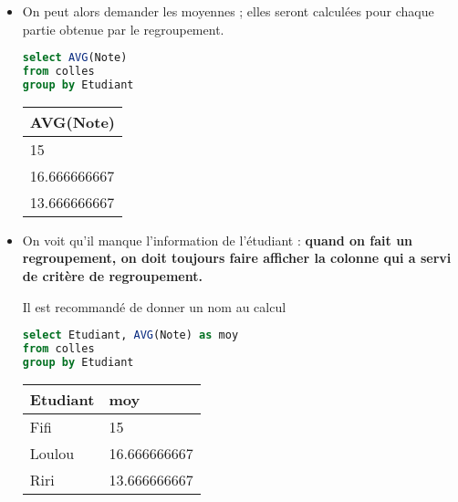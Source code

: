 \vfill

\begin{itemize}
\item
On peut alors demander les moyennes ; elles seront calculées pour chaque partie obtenue par le regroupement.

\begin{minipage}[t]{0.60\linewidth}
\begin{lstlisting}[language=SQL]
select AVG(Note)
from colles
group by Etudiant
\end{lstlisting}
\end{minipage}
\begin{minipage}[t]{0.30\linewidth}
\begin{center}
\begin{tabular}[t]{|l|}
\hline
\bf AVG(Note) \\ 
\hline
15\\
16.666666667\\
13.666666667\\
\hline
\end{tabular}
\end{center}
\end{minipage}

\newpage
\item
On voit qu'il manque l'information de l'étudiant : {\bf quand on fait un regroupement, on doit toujours faire afficher la colonne qui a servi de critère de regroupement.}

Il est recommandé de donner un nom au calcul

\begin{minipage}[t]{0.6\linewidth}
\begin{lstlisting}[language=SQL]
select Etudiant, AVG(Note) as moy
from colles
group by Etudiant
\end{lstlisting}
\end{minipage}
\begin{minipage}[t]{0.35\linewidth}
\begin{center}
\begin{tabular}[t]{|l|l|}
\hline
\bf Etudiant &\bf moy \\ 
\hline
Fifi&15\\
Loulou&16.666666667\\
Riri&13.666666667\\
\hline
\end{tabular}
\end{center}
\end{minipage}


\end{itemize}
